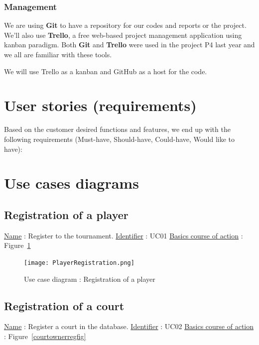 \subsubsection{Management}

We are using \textbf{Git} to have a repository for our codes and reports or the project. We'll also use \textbf{Trello}, a free web-based project management application using kanban paradigm. Both \textbf{Git} and \textbf{Trello} were used in the project P4 last year and we all are familiar with these tools.

We will use Trello as a kanban and GitHub as a host for the code. \newline
\fi

\section{User stories (requirements)}
Based on the customer desired functions and features, we end up with the
following requirements (Must-have, Should-have, Could-have, Would like
to have):



\section{Use cases diagrams}
\subsection{Registration of a player}

\noindent \underline{Name} : Register to the tournament. \newline
\underline{Identifier} : UC01 \newline
\underline{Basics course of action} : Figure~\ref{playerregistrationfig} \newline

\begin{figure}[!ht]
    \centering
    \texttt{[image: PlayerRegistration.png]}
    \caption{Use case diagram : Registration of a player}
    \label{playerregistrationfig}
\end{figure}
\FloatBarrier

\subsection{Registration of a court}

\noindent \underline{Name} : Register a court in the database. \newline
\underline{Identifier} : UC02 \newline
\underline{Basics course of action} : Figure~\ref{courtownerregfig} \newline


